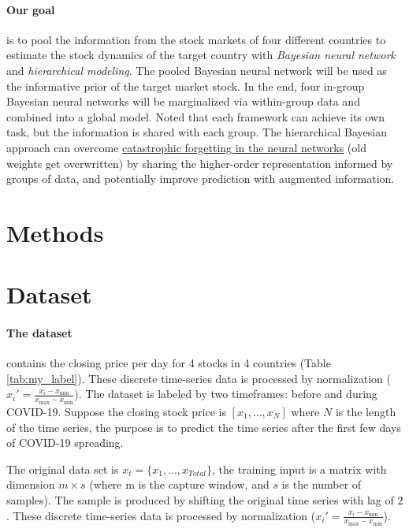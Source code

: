\documentclass{article}
\begin{document}
\paragraph{Our goal} is to pool the information from the stock markets of four different countries to estimate the stock dynamics of the target country with \textit{Bayesian neural network} and \textit{hierarchical modeling}. The pooled Bayesian neural network will be used as the informative prior of the target market stock. In the end, four in-group Bayesian neural networks will be marginalized via within-group data and combined into a global model. Noted that each framework can achieve its own task, but the information is shared with each group. The hierarchical Bayesian approach can overcome \href{https://www.pnas.org/doi/10.1073/pnas.1611835114#sec-3}{catastrophic forgetting in the neural networks} (old weights get overwritten) by sharing the higher-order representation informed by groups of data, and potentially improve prediction with augmented information.



\section{Methods}



\section{Dataset}

\paragraph{The dataset} contains the closing price per day for 4 stocks in 4 countries (Table \ref{tab:my_label}). These discrete time-series data is processed by normalization ($x_{i}' = \frac{x_{i} - x_{\min}}{x_{\max} - x_{\min}}$). The dataset is labeled by two timeframes: before and during COVID-19. Suppose the closing stock price is $[x_1, \dots, x_N]$ where $N$ is the length of the time series, the purpose is to predict the time series after the first few days of COVID-19 spreading.



The original data set is $x_t = \{x_{1}, ..., x_{Total}\}$, the training input is a matrix with dimension $m \times s$ (where m is the capture window, and $s$ is the number of samples). The sample is produced by shifting the original time series with lag of $2$.  These discrete time-series data is processed by normalization ($x_{i}' = \frac{x_{i} - x_{\min}}{x_{\max} - x_{\min}}$). 
\end{document}
